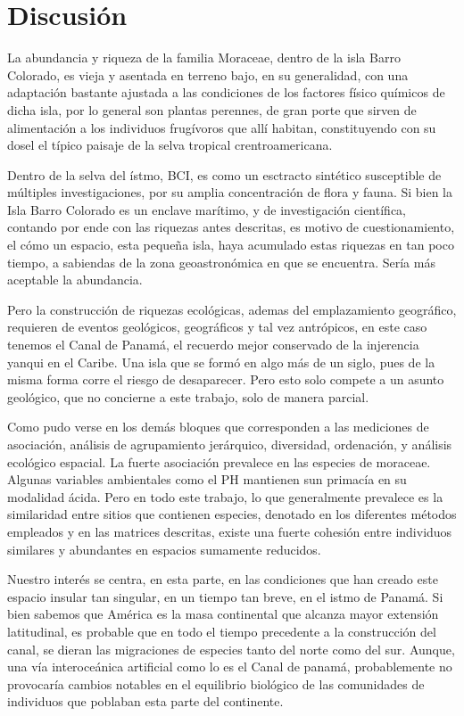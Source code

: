 \documentclass[11pt,]{article}
\begin{document}
\section{Discusión}\label{discusiuxf3n}

La abundancia y riqueza de la familia Moraceae, dentro de la isla Barro
Colorado, es vieja y asentada en terreno bajo, en su generalidad, con
una adaptación bastante ajustada a las condiciones de los factores
físico químicos de dicha isla, por lo general son plantas perennes, de
gran porte que sirven de alimentación a los individuos frugívoros que
allí habitan, constituyendo con su dosel el típico paisaje de la selva
tropical crentroamericana.

Dentro de la selva del ístmo, BCI, es como un esctracto sintético
susceptible de múltiples investigaciones, por su amplia concentración de
flora y fauna. Si bien la Isla Barro Colorado es un enclave marítimo, y
de investigación científica, contando por ende con las riquezas antes
descritas, es motivo de cuestionamiento, el cómo un espacio, esta
pequeña isla, haya acumulado estas riquezas en tan poco tiempo, a
sabiendas de la zona geoastronómica en que se encuentra. Sería más
aceptable la abundancia.

Pero la construcción de riquezas ecológicas, ademas del emplazamiento
geográfico, requieren de eventos geológicos, geográficos y tal vez
antrópicos, en este caso tenemos el Canal de Panamá, el recuerdo mejor
conservado de la injerencia yanqui en el Caribe. Una isla que se formó
en algo más de un siglo, pues de la misma forma corre el riesgo de
desaparecer. Pero esto solo compete a un asunto geológico, que no
concierne a este trabajo, solo de manera parcial.

Como pudo verse en los demás bloques que corresponden a las mediciones
de asociación, análisis de agrupamiento jerárquico, diversidad,
ordenación, y análisis ecológico espacial. La fuerte asociación
prevalece en las especies de moraceae. Algunas variables ambientales
como el PH mantienen sun primacía en su modalidad ácida. Pero en todo
este trabajo, lo que generalmente prevalece es la similaridad entre
sitios que contienen especies, denotado en los diferentes métodos
empleados y en las matrices descritas, existe una fuerte cohesión entre
individuos similares y abundantes en espacios sumamente reducidos.

Nuestro interés se centra, en esta parte, en las condiciones que han
creado este espacio insular tan singular, en un tiempo tan breve, en el
istmo de Panamá. Si bien sabemos que América es la masa continental que
alcanza mayor extensión latitudinal, es probable que en todo el tiempo
precedente a la construcción del canal, se dieran las migraciones de
especies tanto del norte como del sur. Aunque, una vía interoceánica
artificial como lo es el Canal de panamá, probablemente no provocaría
cambios notables en el equilibrio biológico de las comunidades de
individuos que poblaban esta parte del continente.
\end{document}
